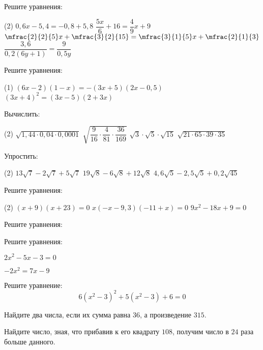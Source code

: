 %
%

\begin{class}[number=1]
	\begin{listofex}
		\item Решите уравнения: %
		\begin{tasks}(2)
			\task \( 0,6x-5,4=-0,8+5,8 \)
			\task \( \dfrac{5x}{6}+16=\dfrac{4}{9}x+9 \)
			\task \( \mfrac{2}{2}{5}x+ \mfrac{3}{2}{15}=\mfrac{3}{1}{5}x + \mfrac{2}{1}{3} \)
			\task \( \dfrac{3,6}{0,2(6y+1)}=\dfrac{9}{0,5y} \)
		\end{tasks}
		\item Решите уравнения:
		\begin{tasks}(1)
			\task \( (6x-2)(1-x)=-(3x+5)(2x-0,5) \)
			\task \( (3x+4)^2=(3x-5)(2+3x) \)
		\end{tasks}
		\item Вычислить:
		\begin{tasks}(2)
			\task \( \sqrt{1,44\cdot0,04\cdot0,0001} \)
			\task \( \sqrt{\dfrac{9}{16}\cdot\dfrac{4}{81}\cdot\dfrac{36}{169}} \)
			\task \( \sqrt{3}\cdot\sqrt{5}\cdot\sqrt{15} \)
			\task \( \sqrt{21\cdot65\cdot39\cdot35} \)
		\end{tasks}
		\item Упростить:
		\begin{tasks}(2)
			\task \( 13\sqrt{7}-2\sqrt{7}+5\sqrt{7} \)
			\task \( 19\sqrt{8}-6\sqrt{8}+12\sqrt{8} \)
			\task \( 4,6\sqrt{5}-2,5\sqrt{5}+0,2\sqrt{45} \)
			\task \exercise{1630}
		\end{tasks}
		\item Решите уравнения: %
		\begin{tasks}(2)
			\task \( (x+9)(x+23)=0 \)
			\task \( x(-x-9,3)(-11+x)=0 \)
			\task \( 9x^2-18x+9=0 \)
		\end{tasks}
		\item Решите уравнения:
		\begin{enumcols}[itemcolumns=3]
			\item {}
			\item {}
			\item {}
			\item {}
		\end{enumcols}
		\item Решите уравнения:
		\begin{enumcols}[itemcolumns=2]
			\item \( 2x^2-5x-3=0 \)
			\item \( -2x^2=7x-9 \)
		\end{enumcols}
		\item Решите уравнение:
		\[6(x^2-3)^2+5(x^2-3)+6=0\]
		\item Найдите два числа, если их сумма равна \( 36 \), а произведение \( 315 \).
		\item Найдите число, зная, что прибавив к его квадрату \( 108 \), получим число в \( 24 \) раза больше данного.
	\end{listofex}
\end{class}

